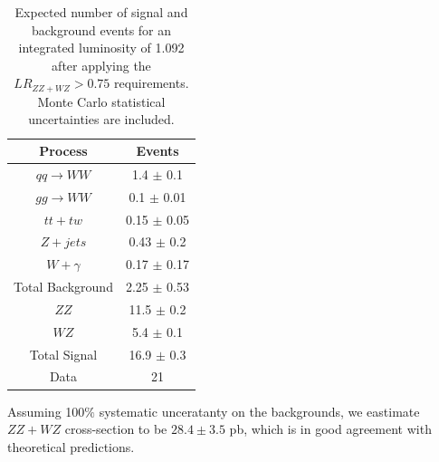 \begin{table}[!ht]
  \begin{center}
 {\scriptsize
  \begin{tabular} {|c|c|}
 \hline
  Process & Events \\
  \hline
  \hline
  $qq \rightarrow WW$   &  1.4 $\pm$   0.1 \\
  $gg \rightarrow WW$   &  0.1 $\pm$   0.01 \\
  $tt + tw$             &  0.15 $\pm$  0.05 \\
  $Z  + jets$           &  0.43 $\pm$  0.2 \\
  $W  + \gamma$          &  0.17 $\pm$  0.17 \\
  \hline
  Total Background      &  2.25 $\pm$  0.53 \\
  \hline
  $ZZ$                  &  11.5 $\pm$  0.2 \\
  $WZ$                  &  5.4  $\pm$  0.1 \\
 \hline
  Total Signal          &  16.9 $\pm$  0.3 \\
 \hline
  Data                  &  21               \\
 \hline
  \end{tabular}
  }
  \caption{Expected number of signal and background events for an 
  integrated luminosity of 1.092 \ifb{} after applying the $LR_{ZZ+WZ}>0.75$ requirements. 
 Monte Carlo statistical  uncertainties are included.}
   \label{tab:ZZWZselection}
  \end{center}
\end{table}
Assuming 100$\%$ systematic unceratanty on the backgrounds, we eastimate $ZZ+WZ$ cross-section to be 
$28.4 \pm 3.5$ pb, which is in good agreement with theoretical predictions.
